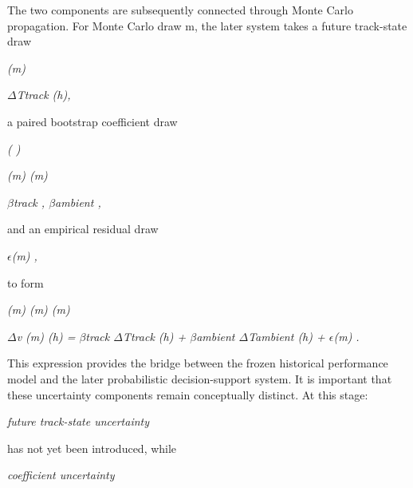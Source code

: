 The two components are subsequently connected through Monte Carlo propagation. For Monte Carlo draw m, the later system takes a future track-state draw

\begin{center}\textit{(m)}\end{center}

\begin{center}\textit{\ensuremath{\Delta}Ttrack (h),}\end{center}

a paired bootstrap coefficient draw

\begin{center}\textit{(                    )}\end{center}

\begin{center}\textit{(m)      (m)}\end{center}

\begin{center}\textit{\ensuremath{\beta}track , \ensuremath{\beta}ambient ,}\end{center}

and an empirical residual draw

\begin{center}\textit{\ensuremath{\epsilon}(m) ,}\end{center}

to form

\begin{center}\textit{(m)      (m)                (m)}\end{center}

\begin{center}\textit{\ensuremath{\Delta}v (m) (h) = \ensuremath{\beta}track \ensuremath{\Delta}Ttrack (h) + \ensuremath{\beta}ambient \ensuremath{\Delta}Tambient (h) + \ensuremath{\epsilon}(m) .}\end{center}

This expression provides the bridge between the frozen historical performance model and the later probabilistic decision-support system. It is important that these uncertainty components remain conceptually distinct. At this stage:

\begin{center}\textit{future track-state uncertainty}\end{center}

has not yet been introduced, while

\begin{center}\textit{coefficient uncertainty}\end{center}

